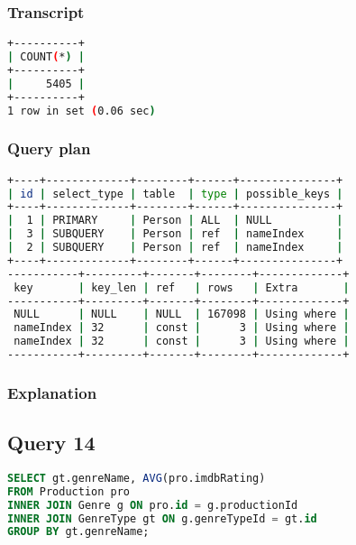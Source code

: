 \subsubsection{Transcript}
\begin{lstlisting}[language=bash]
+----------+
| COUNT(*) |
+----------+
|     5405 |
+----------+
1 row in set (0.06 sec)
\end{lstlisting}

\subsubsection{Query plan}
\begin{lstlisting}[language=bash]
+----+-------------+--------+------+---------------+
| id | select_type | table  | type | possible_keys |
+----+-------------+--------+------+---------------+
|  1 | PRIMARY     | Person | ALL  | NULL          |
|  3 | SUBQUERY    | Person | ref  | nameIndex     |
|  2 | SUBQUERY    | Person | ref  | nameIndex     |
+----+-------------+--------+------+---------------+
-----------+---------+-------+--------+-------------+
 key       | key_len | ref   | rows   | Extra       |
-----------+---------+-------+--------+-------------+
 NULL      | NULL    | NULL  | 167098 | Using where |
 nameIndex | 32      | const |      3 | Using where |
 nameIndex | 32      | const |      3 | Using where |
-----------+---------+-------+--------+-------------+
\end{lstlisting}

\subsubsection{Explanation}


\subsection{Query 14}
\begin{lstlisting}[language=sql]
SELECT gt.genreName, AVG(pro.imdbRating)
FROM Production pro
INNER JOIN Genre g ON pro.id = g.productionId
INNER JOIN GenreType gt ON g.genreTypeId = gt.id
GROUP BY gt.genreName;
\end{lstlisting}

